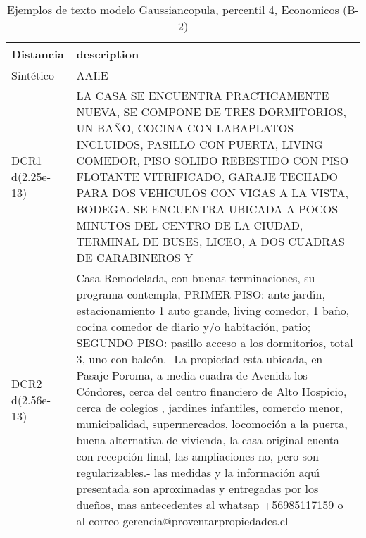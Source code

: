 \begin{table}[H]
\centering
\fontsize{10}{14}\selectfont
\caption{Ejemplos de texto modelo Gaussiancopula, percentil 4, Economicos (B-2)}
\label{table-example-economicos-b-2-gaussiancopula-4p-text}
\begin{tabular}{|l|m{35em}|}
\hline
\rowcolor[gray]{0.8}
Distancia & description \\
\hline Sintético & AAIiE \\
\hline DCR1 d(2.25e-13) & LA CASA SE ENCUENTRA PRACTICAMENTE NUEVA, SE COMPONE DE TRES DORMITORIOS, UN BA\~NO, COCINA CON LABAPLATOS INCLUIDOS, PASILLO CON PUERTA, LIVING COMEDOR, PISO SOLIDO REBESTIDO CON PISO FLOTANTE VITRIFICADO, GARAJE TECHADO PARA DOS VEHICULOS CON VIGAS A LA VISTA, BODEGA. SE ENCUENTRA UBICADA A POCOS MINUTOS DEL CENTRO DE LA CIUDAD, TERMINAL DE BUSES, LICEO, A DOS CUADRAS DE CARABINEROS Y  \\
\hline DCR2 d(2.56e-13) & Casa Remodelada, con buenas terminaciones, su programa contempla, PRIMER PISO: ante-jard{\'\i}n, estacionamiento 1 auto grande, living comedor, 1 ba\~no, cocina comedor de diario y/o habitaci\'on, patio; SEGUNDO PISO: pasillo acceso a los dormitorios, total 3, uno con balc\'on.- La propiedad esta ubicada, en Pasaje Poroma, a media cuadra de Avenida los C\'ondores, cerca del centro financiero de Alto Hospicio, cerca de colegios , jardines infantiles, comercio menor, municipalidad, supermercados, locomoci\'on a la puerta, buena alternativa de vivienda, la casa original cuenta con recepci\'on final, las ampliaciones no, pero son regularizables.-
las medidas y la informaci\'on aqu{\'\i} presentada son aproximadas y entregadas por los due\~nos, mas antecedentes al whatsap +56985117159 o al correo gerencia@proventarpropiedades.cl
  \\
\hline
\end{tabular}
\end{table}
